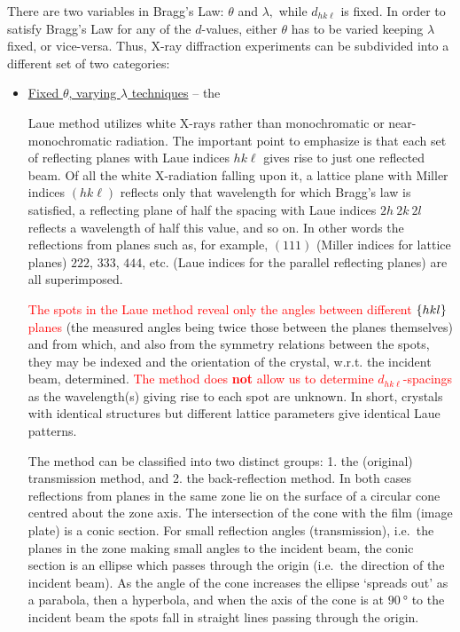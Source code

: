 There are two variables in Bragg's Law: $\theta$ and $\lambda,$ while $d_{hk\ell}$ is fixed. In order to satisfy Bragg's Law for any of the $d$-values, either $\theta$ has to be varied keeping $\lambda$ fixed, or vice-versa. Thus, X-ray diffraction experiments can be subdivided into a different set of two categories:

	\begin{itemize}
	
	    \item \ul{Fixed $\theta$, varying $\lambda$ techniques} -- the 
	    
	    Laue method utilizes white X-rays rather than monochromatic or near-monochromatic radiation. The important point to emphasize is that each set of reflecting planes with Laue indices $h k \ell$ gives rise to just one reflected beam. Of all the white X-radiation falling upon it, a lattice plane with Miller indices $(h k \ell)$ reflects only that wavelength for which Bragg’s law is satisfied, a reflecting plane of half the spacing with Laue indices $2h ~ 2k ~ 2l$ reflects a wavelength of half this value, and so on. In other words the reflections from planes such as, for example, $(111)$ (Miller indices for lattice planes) $222$, $333$, $444$, etc. (Laue indices for the parallel reflecting planes) are all superimposed.
	    
	    \textcolor{red}{The spots in the Laue method reveal only the angles between different $\qty{hkl}$ planes} (the measured angles being twice those between the planes themselves) and from which, and also from the symmetry relations between the spots, they may be indexed and the orientation of the crystal, w.r.t. the incident beam, determined. \textcolor{red}{The method does \textbf{not} allow us to determine $d_{hk\ell}$-spacings} as the wavelength(s) giving rise to each spot are unknown. In short, crystals with identical structures but different lattice parameters give identical Laue patterns.
	    
	    The method can be classified into two distinct groups: 1. the (original) transmission method, and 2. the back-reflection method. In both cases reflections from planes in the same zone lie on the surface of a circular cone centred about the zone axis. The intersection of the cone with the film (image plate) is a conic section. For small reflection angles (transmission), i.e.\ the planes in the zone making small angles to the incident beam, the conic section is an ellipse which passes through the origin (i.e.\ the direction of the incident beam). As the angle of the cone increases the ellipse `spreads out' as a parabola, then a hyperbola, and when the axis of the cone is at $\SI{90}{\degree}$ to the incident beam the spots fall in straight lines passing through the origin.
	    

\end{itemize}
